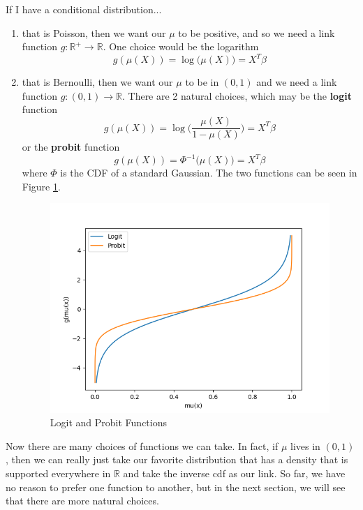   \begin{example}
  If I have a conditional distribution... 
  \begin{enumerate}
      \item that is Poisson, then we want our $\mu$ to be positive, and so we need a link function $g: \mathbb{R}^+ \rightarrow \mathbb{R}$. One choice would be the logarithm 
      \[g(\mu(X)) = \log \big( \mu(X) \big) = X^T \beta\]

      \item that is Bernoulli, then we want our $\mu$ to be in $(0, 1)$ and we need a link function $g: (0, 1) \rightarrow \mathbb{R}$. There are 2 natural choices, which may be the \textbf{logit} function 
      \[g(\mu(X)) = \log \bigg( \frac{\mu(X)}{1 - \mu(X)} \bigg) = X^T \beta\]
      or the \textbf{probit} function 
      \[g(\mu(X)) = \Phi^{-1} \big(\mu(X)\big) = X^T \beta \]
      where $\Phi$ is the CDF of a standard Gaussian. The two functions can be seen in Figure \ref{fig:logit_probit}. 
      \begin{figure}[H]
          \centering
          \includegraphics[scale=0.5]{img/probit_logit.png}
          \caption{Logit and Probit Functions}
          \label{fig:logit_probit}
      \end{figure}
  \end{enumerate}
  \end{example}

  Now there are many choices of functions we can take. In fact, if $\mu$ lives in $(0, 1)$, then we can really just take our favorite distribution that has a density that is supported everywhere in $\mathbb{R}$ and take the inverse cdf as our link. So far, we have no reason to prefer one function to another, but in the next section, we will see that there are more natural choices. 

